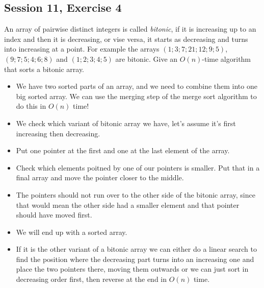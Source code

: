 \subsection {Session 11, Exercise 4}


An array of pairwise distinct integers is called \textit{bitonic}, if it is increasing up to an index and then it is decreasing, or vise versa, it starts as decreasing and turns into increasing at a point. For example the arrays $(1; 3; 7; 21; 12; 9; 5)$, $(9; 7; 5; 4; 6; 8)$ and $(1; 2; 3; 4; 5)$ are bitonic. Give an $O(n)$-time algorithm that sorts a bitonic array.


\begin{itemize}
    \item We have two sorted parts of an array, and we need to combine them into one big sorted array. We can use the merging step of the merge sort algorithm to do this in $O(n)$ time!
    \item We check which variant of bitonic array we have, let's assume it's first increasing then decreasing.
    \item Put one pointer at the first and one at the last element of the array.
    \item Check which elements poitned by one of our pointers is smaller. Put that in a final array and move the pointer closer to the middle.
    \item The pointers should not run over to the other side of the bitonic array, since that would mean the other side had a smaller element and that pointer should have moved first.
    \item We will end up with a sorted array.
    \item If it is the other variant of a bitonic array we can either do a linear search to find the position where the decreasing part turns into an increasing one and place the two pointers there, moving them outwards or we can just sort in decreasing order first, then reverse at the end in $O(n)$ time.
\end{itemize}

